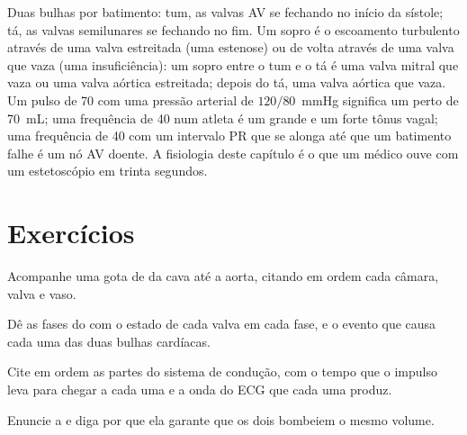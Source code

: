 \begin{example}\label{ex:b2:heart:reading}
Duas bulhas por batimento: tum, as valvas AV se fechando no início da
sístole; tá, as valvas semilunares se fechando no fim. Um sopro é o
escoamento turbulento através de uma valva estreitada (uma estenose)
ou de volta através de uma valva que vaza (uma insuficiência): um sopro
entre o tum e o tá é uma valva mitral que vaza ou uma valva aórtica
estreitada; depois do tá, uma valva aórtica que vaza. Um pulso de 70
com uma pressão arterial de $120/80$~mmHg significa um 
perto de \qty{70}{mL}; uma frequência de 40 num atleta é um grande
 e um forte tônus vagal; uma frequência de 40 com um
intervalo PR que se alonga até que um batimento falhe é um nó AV
doente. A fisiologia deste capítulo é o que um médico ouve com um
estetoscópio em trinta segundos.
\end{example}

\section{Exercícios}

\begin{exercise}[$\star$]\label{exo:b2:heart:1}
Acompanhe uma gota de  da  cava até a aorta, citando em ordem
cada câmara, valva e vaso.
\end{exercise}

\begin{exercise}[$\star$]\label{exo:b2:heart:2}
Dê as fases do  com o estado de cada valva em cada fase,
e o evento que causa cada uma das duas bulhas cardíacas.
\end{exercise}

\begin{exercise}[$\star$]\label{exo:b2:heart:3}
Cite em ordem as partes do sistema de condução, com o tempo que o
impulso leva para chegar a cada uma e a onda do ECG que cada uma produz.
\end{exercise}

\begin{exercise}[$\star$]\label{exo:b2:heart:4}
Enuncie a  e diga por que ela garante que os dois
 bombeiem o mesmo volume.
\end{exercise}

